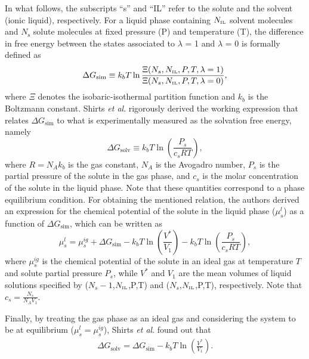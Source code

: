 \documentclass[3p,twocolumn]{elsarticle}
\begin{document}
In what follows, the subscripts ``s'' and ``IL'' refer to the solute and the solvent (ionic liquid), respectively.
For a liquid phase containing $N_\text{\tiny IL}$ solvent molecules and $N_{\text{s}}$ solute molecules at fixed pressure (P) and temperature (T), the difference in free energy between the states associated to $\lambda$ = 1 and $\lambda$ = 0 is formally defined as
\begin{equation}
\Delta G_\text{sim} \equiv k_b T \ln \frac{\Xi (N_s,N_\text{\tiny IL},P,T,\lambda = 1)}{\Xi (N_s,N_\text{\tiny IL},P,T,\lambda = 0)}, 
\end{equation}
where $\Xi$ denotes the isobaric-isothermal partition function and $k_b$ is the Boltzmann constant.
Shirts \textit{et al}. \cite{Shirts_2003} rigorously derived the working expression that relates $\Delta G_\text{sim}$ to what is experimentally measured as the solvation free energy, namely
\begin{equation}
\label{eq:solvation free energy definition}
\Delta G_{\text{solv}} \equiv k_b T \ln \left( \frac{P_s}{c_s R T} \right),
\end{equation}
where $R = N_A k_b$ is the gas constant,
$N_A$ is the Avogadro number,
$P_s$ is the partial pressure of the solute in the gas phase, and
$c_s$ is the molar concentration of the solute in the liquid phase.
Note that these quantities correspond to a phase equilibrium condition.
For obtaining the mentioned relation, the authors derived an expression for the chemical potential of the solute in the liquid phase ($\mu^l_s$) as a function of $\Delta G_\text{sim}$, which can be written as
\begin{equation}
\label{eq:solute chemical potential}
\mu^l_s = \mu^{ig}_s + \Delta G_\text{sim} - k_bT \ln \left( \frac{V^{\ast}}{V_1}\right) - k_bT \ln \left( \frac{P_s}{c_s R T} \right),
\end{equation}
where $\mu^{ig}_s$ is the chemical potential of the solute in an ideal gas at temperature $T$ and solute partial pressure $P_s$, while $V^{\ast}$ and $V_1$ are the mean volumes of liquid solutions specified by ($N_s-1$,$N_\text{\tiny IL}$,P,T) and ($N_s$,$N_\text{\tiny IL}$,P,T), respectively.
Note that $c_s = \frac{N_s}{N_A V_1}$.

Finally, by treating the gas phase as an ideal gas and considering the system to be at equilibrium ($\mu^l_s = \mu^{ig}_s$), Shirts \textit{et al}. \cite{Shirts_2003} found out that
\begin{equation}
\begin{split}
\label{eq:free_solv}
 \Delta G_{\text{solv}} = \Delta G_\text{sim} - k_bT \ln \left( \frac{V^{\ast}}{V_1}\right).
\end{split}
\end{equation}
\end{document}
